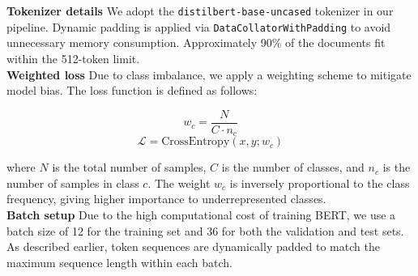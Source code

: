 \documentclass[twoside,final]{hcmut-report}
\begin{document}
\noindent \textbf{Tokenizer details} We adopt the \texttt{distilbert-base-uncased} tokenizer in our pipeline. Dynamic padding is applied via \texttt{DataCollatorWithPadding} to avoid unnecessary memory consumption. Approximately 90\% of the documents fit within the 512-token limit. \\ 

\noindent \textbf{Weighted loss} Due to class imbalance, we apply a weighting scheme to mitigate model bias. The loss function is defined as follows:

\begin{equation}
w_c = \frac{N}{C \cdot n_c}
\end{equation}
\begin{equation}
\mathcal{L} = \text{CrossEntropy}(x, y; w_c)
\end{equation}

\noindent where $N$ is the total number of samples, $C$ is the number of classes, and $n_c$ is the number of samples in class $c$. The weight $w_c$ is inversely proportional to the class frequency, giving higher importance to underrepresented classes. \\

\noindent \textbf{Batch setup} Due to the high computational cost of training BERT, we use a batch size of 12 for the training set and 36 for both the validation and test sets. As described earlier, token sequences are dynamically padded to match the maximum sequence length within each batch. \\ 
\end{document}
